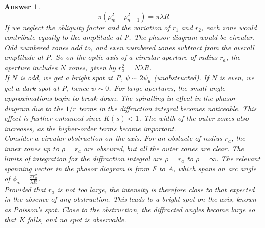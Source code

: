 \documentclass[a4paper]{article}
\newtheorem{ans}{Answer}[subsection]
\theoremstyle{new}
\begin{document}
\begin{ans}
$$\pi(\rho_n^2-\rho_{n-1}^2)=\pi\lambda R$$
If we neglect the obliquity factor and the variation of $r_1$ and $r_2$, each zone would contribute equally to the amplitude at P. The phasor diagram would be circular. Odd numbered zones add to, and even numbered zones subtract from the overall amplitude at P. So on the optic axis of a circular aperture of radius $r_a$, the aperture includes $N$ zones, given by $r_a^2=N\lambda R$.\\[5pt]
If $N$ is odd, we get a bright spot at P, $\psi\sim2\psi_u$ (unobstructed). If $N$ is even, we get a dark spot at P, hence $\psi\sim 0$. For large apertures, the small angle approximations begin to break down. The spiralling in effect in the phasor diagram due to the $1/r$ terms in the diffraction integral becomes noticeable. This effect is further enhanced since $K(s)<1$. The width of the outer zones also increases, as the higher-order terms become important.\\[5pt]
Consider a circular obstruction on the axis. For an obstacle of radius $r_a$, the inner zones up to $\rho=r_a$ are obscured, but all the outer zones are clear. The limits of integration for the diffraction integral are $\rho=r_a$ to $\rho=\infty$. The relevant spanning vector in the phasor diagram is from F to A, which spans an arc angle of $\phi_a=\frac{\pi r_a^2}{\lambda R}$.\\[5pt]
Provided that $r_a$ is not too large, the intensity is therefore close to that expected in the absence of any obstruction. This leads to a bright spot on the axis, known as Poisson's spot. Close to the obstruction, the diffracted angles become large so that $K$ falls, and no spot is observable.
\newpage

\end{ans}
\end{document}
